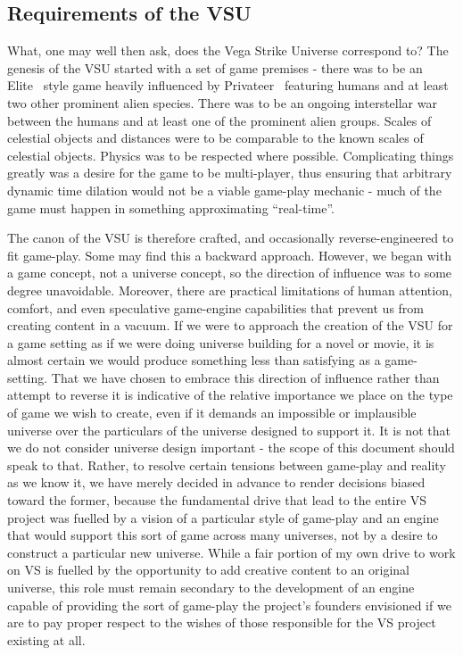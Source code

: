 \subsection{Requirements of the VSU}
What, one may well then ask, does the Vega Strike Universe correspond
to? The genesis of the VSU started with a set of game premises - there
was to be an Elite~\cite{Elite} style game heavily influenced by
Privateer~\cite{Privateer} featuring humans and at least two other
prominent alien species. There was to be an ongoing interstellar war
between the humans and at least one of the prominent alien
groups. Scales of celestial objects and distances were to be
comparable to the known scales of celestial objects. Physics was to be
respected where possible. Complicating things greatly was a desire for
the game to be multi-player, thus ensuring that arbitrary dynamic time
dilation would not be a viable game-play mechanic - much of the game
must happen in something approximating ``real-time''.

The canon of the VSU is therefore crafted, and occasionally
reverse-engineered to fit game-play. Some may find this a backward
approach. However, we began with a game concept, not a universe
concept, so the direction of influence was to some degree
unavoidable. Moreover, there are practical limitations of human
attention, comfort, and even speculative game-engine capabilities that
prevent us from creating content in a vacuum. If we were to approach
the creation of the VSU for a game setting as if we were doing
universe building for a novel or movie, it is almost certain we would
produce something less than satisfying as a game-setting. That we have
chosen to embrace this direction of influence rather than attempt to
reverse it is indicative of the relative importance we place on the
type of game we wish to create, even if it demands an impossible or
implausible universe over the particulars of the universe designed to
support it. It is not that we do not consider universe design
important - the scope of this document should speak to that. Rather,
to resolve certain tensions between game-play and reality as we know
it, we have merely decided in advance to render decisions biased
toward the former, because the fundamental drive that lead to the
entire VS project was fuelled by a vision of a particular style of
game-play and an engine that would support this sort of game across
many universes, not by a desire to construct a particular new
universe. While a fair portion of my own drive to work on VS is
fuelled by the opportunity to add creative content to an original
universe, this role must remain secondary to the development of an
engine capable of providing the sort of game-play the project's
founders envisioned if we are to pay proper respect to the wishes of
those responsible for the VS project existing at all.

